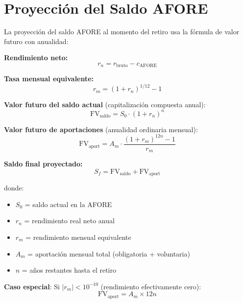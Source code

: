 \documentclass[11pt,a4paper]{report}
\begin{document}
\section{Proyecci\'on del Saldo AFORE}

\begin{tcolorbox}[colback=blue!5!white, colframe=blue!75!black, title=\textbf{Definici\'on Formal}]
La proyecci\'on del saldo AFORE al momento del retiro usa la f\'ormula de valor futuro con anualidad:

\textbf{Rendimiento neto:}
\[
r_n = r_{\text{bruto}} - c_{\text{AFORE}}
\]

\textbf{Tasa mensual equivalente:}
\[
r_m = (1 + r_n)^{1/12} - 1
\]

\textbf{Valor futuro del saldo actual} (capitalizaci\'on compuesta anual):
\[
\text{FV}_{\text{saldo}} = S_0 \cdot (1 + r_n)^n
\]

\textbf{Valor futuro de aportaciones} (anualidad ordinaria mensual):
\[
\text{FV}_{\text{aport}} = A_m \cdot \frac{(1 + r_m)^{12n} - 1}{r_m}
\]

\textbf{Saldo final proyectado:}
\[
S_f = \text{FV}_{\text{saldo}} + \text{FV}_{\text{aport}}
\]

donde:
\begin{itemize}[nosep]
\item $S_0$ = saldo actual en la AFORE
\item $r_n$ = rendimiento real neto anual
\item $r_m$ = rendimiento mensual equivalente
\item $A_m$ = aportaci\'on mensual total (obligatoria + voluntaria)
\item $n$ = a\~nos restantes hasta el retiro
\end{itemize}

\textbf{Caso especial}: Si $|r_m| < 10^{-10}$ (rendimiento efectivamente cero):
\[
\text{FV}_{\text{aport}} = A_m \times 12n
\]
\end{tcolorbox}
\end{document}
